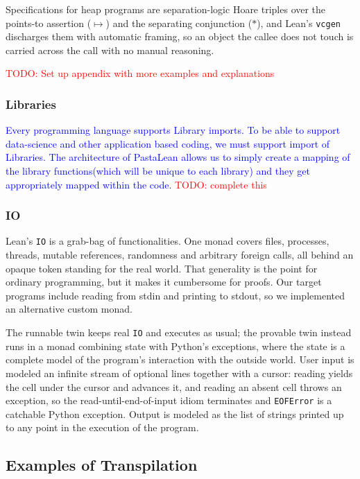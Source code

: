 \documentclass{article}
\newcommand{\code}{\lstinline}
\newcommand{\todo}[1]{\textcolor{red}{TODO: #1}}
\newcommand{\suggest}[1]{\textcolor{blue}{#1}}
\begin{document}
{Specifications for heap programs are separation-logic Hoare triples over the points-to assertion
($\mapsto$) and the separating conjunction ($\ast$), and Lean's \code{vcgen} discharges them
with automatic framing, so an object the callee does not touch is carried across the call with no manual reasoning.

\todo{Set up appendix with more examples and explanations}

\subsubsection{Libraries}

\suggest{Every programming language supports Library imports. To be able to support data-science and other application based coding, we must support import of Libraries. The architecture of PastaLean allows us to simply create a mapping of the library functions(which will be unique to each library) and they get appropriately mapped within the code.
\todo{complete this}}

\subsubsection{IO}\label{sec:io}

Lean's \code{IO} is a grab-bag of functionalities. One monad covers files, processes, threads, mutable references,
randomness and arbitrary foreign calls, all behind an opaque token standing for the real world. That generality is the point for ordinary programming, but it makes it cumbersome for proofs. Our target programs include reading from stdin and printing to stdout, so we implemented an alternative custom monad.

The runnable twin keeps real \code{IO} and executes as usual; the provable twin instead runs in a monad combining state with Python's exceptions, where the state is a complete model of the
program's interaction with the outside world. User input is modeled an infinite stream of optional lines together
with a cursor: reading yields the cell under the cursor and advances it, and reading an absent cell throws an exception, so the read-until-end-of-input idiom terminates and \code{EOFError}
is a catchable Python exception. Output is modeled as the list of
strings printed up to any point in the execution of the program.

\subsection{Examples of Transpilation}\label{sec:transpilation}

}
\end{document}
